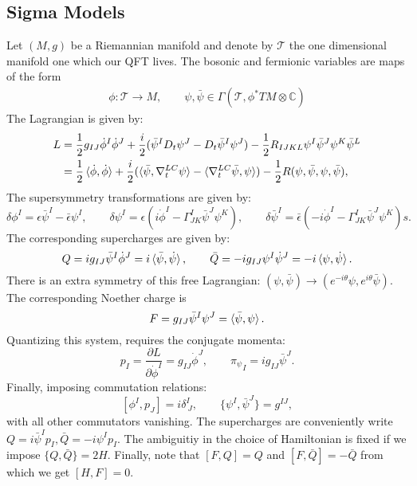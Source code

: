 \documentclass{report}
\theoremstyle{plain}
\theoremstyle{definition}
\theoremstyle{remark}
\newcommand{\di}{\partial}
\newcommand{\bC}{\mathbb{C}}
\newcommand{\mc}{\mathcal}
\newcommand{\sg}{\sigma}
\newcommand{\ten}{\otimes}
\newcommand{\FR}[2]{\frac{#1}{#2}}
\begin{document}
\subsection{Sigma Models}
Let $(M,g)$ be a Riemannian manifold and denote by $\mc T$ the one
dimensional manifold one which our QFT lives. The bosonic and fermionic
variables are maps of the form
\begin{align}
    \phi \colon \mc T\to M,\qquad \psi,\bar\psi\in\Gamma(\mc
    T,\phi^*TM\ten\bC)
    \label{sigmamodelvariables}
\end{align}
The Lagrangian is given by:
\begin{align}
    L &= \FR{1}{2}g_{IJ}\dot\phi^I\dot\phi^J + \FR{i}{2}(\bar\psi^I
    D_t\psi^J-D_t\bar\psi^I\psi^J) - \FR{1}{2} R_{IJKL}\psi^I\bar\psi^J
    \psi^K\bar\psi^L\\
    &=\FR{1}{2}\braket{\dot\phi,\dot\phi} +
    \FR{i}{2}(\braket{\bar\psi,\nabla^{LC}_t\psi}
    -\braket{\nabla^{LC}_t\bar\psi,\psi})
    -\FR{1}{2}R(\psi,\bar\psi,\psi,\bar\psi),
    \label{sigmaModelRiemLag}
\end{align}
The supersymmetry transformations are given by:
\[ \delta\phi^I = \epsilon\bar\psi^I-\bar\epsilon\psi^I,\qquad
\delta\psi^I = \epsilon(i\dot\phi^I-\Gamma^I_{JK}\bar\psi^J\psi^K),\qquad
\delta\bar\psi^I =\bar\epsilon(-i\dot\phi^I-\Gamma^I_{JK}\bar\psi^J\psi^K)s.
\]
The corresponding supercharges are given by:
\[ Q = ig_{IJ}\bar\psi^I\dot\phi^J = i\braket{\bar\psi,\dot\psi},\qquad
\bar Q=-ig_{IJ}\psi^I\dot\psi^J=-i\braket{\psi,\dot\psi}.\]
There is an extra symmetry of this free Lagrangian: $(\psi,\bar\psi) \to
(e^{-i\theta}\psi,e^{i\theta}\bar\psi)$. The corresponding Noether charge
is \[F = g_{IJ}\bar\psi^I\psi^J = \braket{\bar\psi,\psi}.\]
Quantizing this system, requires the conjugate momenta: \[p_I = \FR{\di
L}{\di\dot\phi^I}=g_{IJ}\dot\phi^J,\qquad {\pi_\psi}_I =
ig_{IJ}\bar\psi^J.\] Finally, imposing commutation relations:
\[ [\phi^I,p_J] = i\delta^I_{\ J},\qquad \{\psi^I,\bar\psi^J\} = g^{IJ},\]
with all other commutators vanishing. The supercharges are conveniently
write $Q=i\bar\psi^Ip_I, \bar Q = -i\psi^Ip_I$. The ambiguitiy in the
choice of Hamiltonian is fixed if we impose $\{Q,\bar Q\}=2H$.
Finally, note that $[F,Q]=Q$ and $[F,\bar Q]=-\bar Q$ from which we get
$[H,F]=0$.
\end{document}

